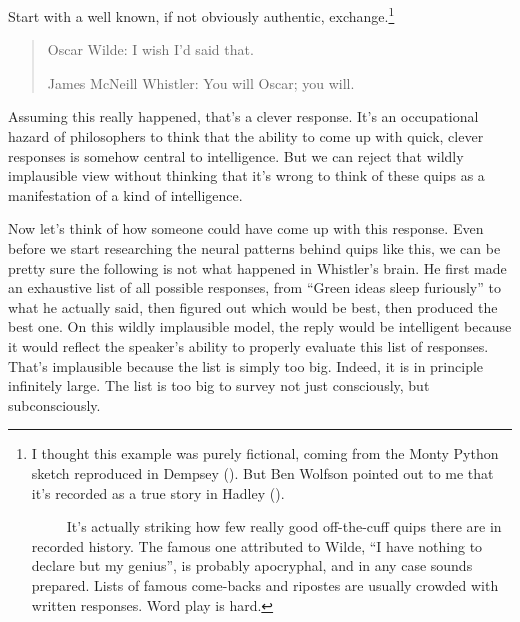 \documentclass[
  10pt,
  letterpaper,
  DIV=11,
  numbers=noendperiod,
  twoside]{scrartcl}
\begin{document}
Start with a well known, if not obviously authentic,
exchange.\footnote{I thought this example was purely fictional, coming
  from the Monty Python sketch reproduced in Dempsey
  (). But Ben Wolfson pointed out
  to me that it's recorded as a true story in Hadley
  ().

  ~~~~~It's actually striking how few really good off-the-cuff quips
  there are in recorded history. The famous one attributed to Wilde, ``I
  have nothing to declare but my genius'', is probably apocryphal, and
  in any case sounds prepared. Lists of famous come-backs and ripostes
  are usually crowded with written responses. Word play is hard.}

\begin{quote}
Oscar Wilde: I wish I'd said that.

James McNeill Whistler: You will Oscar; you will.
\end{quote}

Assuming this really happened, that's a clever response. It's an
occupational hazard of philosophers to think that the ability to come up
with quick, clever responses is somehow central to intelligence. But we
can reject that wildly implausible view without thinking that it's wrong
to think of these quips as a manifestation of a kind of intelligence.

Now let's think of how someone could have come up with this response.
Even before we start researching the neural patterns behind quips like
this, we can be pretty sure the following is not what happened in
Whistler's brain. He first made an exhaustive list of all possible
responses, from ``Green ideas sleep furiously'' to what he actually
said, then figured out which would be best, then produced the best one.
On this wildly implausible model, the reply would be intelligent because
it would reflect the speaker's ability to properly evaluate this list of
responses. That's implausible because the list is simply too big.
Indeed, it is in principle infinitely large. The list is too big to
survey not just consciously, but subconsciously.
\end{document}
